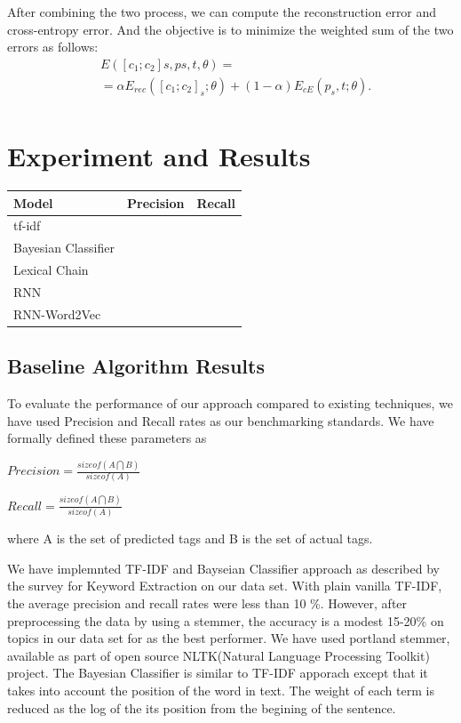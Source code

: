 \documentclass[dvips,12pt]{article}
\begin{document}
After combining the two process, we can compute the reconstruction error and cross-entropy error. And the objective is to minimize the weighted sum of the two errors as follows:
\begin{equation}
\begin{split}
 & E([c_{1}; c_{2}]s, ps, t, θ) = \\
 & = \alpha E_{rec}([c_{1}; c_{2}]_{s}; \theta) + (1 - \alpha)E_{cE}(p_{s}, t; \theta).
\\
 \end{split}
\end{equation}
	\section{Experiment and Results}
    \begin{table}[h]
        \begin{tabular}{|l|l|l|}
            \hline
            Model               & Precision & Recall \\ \hline
            tf-idf              &           &        \\ \hline
            Bayesian Classifier &           &        \\ \hline
            Lexical Chain       &           &        \\ \hline
            RNN                 &           &        \\ \hline
            RNN-Word2Vec        &           &        \\ \hline
        \end{tabular}
    \end{table}
		\subsection{Baseline Algorithm Results}
		
		To evaluate the performance of our approach compared to existing techniques, we have used Precision and Recall rates as our benchmarking standards.
		We have formally defined these parameters as 
		
		$Precision = \frac{ sizeof(A \bigcap B)}{sizeof(A)}$
		
		$Recall    = \frac{ sizeof(A \bigcap B)}{sizeof(A)}$
		
		where A is the set of predicted tags and B is the set of actual tags.
		
		We have implemnted TF-IDF and Bayseian Classifier approach as described by the survey for Keyword Extraction on our data set. With plain vanilla TF-IDF, the average precision and recall rates were less than 10 \%. However, after preprocessing the data by using a stemmer, the accuracy is a modest 15-20\% on topics in our data set for as the best performer.
		We have used portland stemmer, available as part of open source NLTK(Natural Language Processing Toolkit) project.
		The Bayesian Classifier is similar to TF-IDF apporach except that it takes into account the position of the word in text. The weight of each term is reduced as the log of the its position from the begining of the sentence.
		
\end{document}
